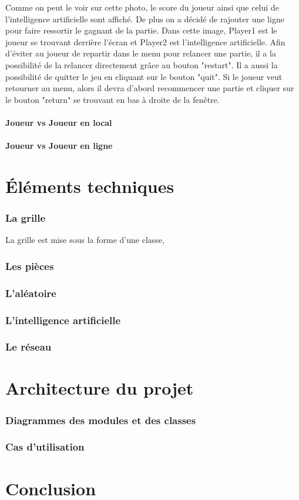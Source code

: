 \documentclass[]{report}
\begin{document}
Comme on peut le voir sur cette photo, le score du joueur ainsi que celui de l'intelligence artificielle sont affiché. De plus on a décidé de rajouter une ligne pour faire ressortir le gagnant de la partie. Dans cette image, Player1 est le joueur se trouvant derrière l'écran et Player2 est l'intelligence artificielle. Afin d'éviter au joueur de repartir dans le menu pour relancer une partie, il a la possibilité de la relancer directement grâce au bouton "restart". Il a aussi la possibilité de quitter le jeu en cliquant sur le bouton "quit". Si le joueur veut retourner au menu, alors il devra d'abord recommencer une partie et cliquer sur le bouton "return" se trouvant en bas à droite de la fenêtre. 
\subsection{Joueur vs Joueur en local}
\subsection{Joueur vs Joueur en ligne}

\part{Éléments techniques}
\section{La grille}
La grille est mise sous la forme d'une classe, 
\section{Les pièces}
\section{L'aléatoire}
\section{L'intelligence artificielle}
\section{Le réseau}

\part{Architecture du projet}
\section{Diagrammes des modules et des classes}
\section{Cas d'utilisation}

\part{Conclusion}
\end{document}
